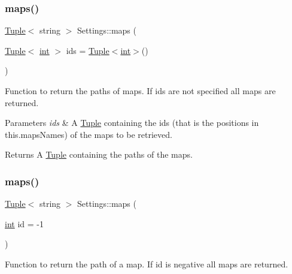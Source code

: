 \subsubsection{\texorpdfstring{maps()}{maps()}\hspace{0.1cm}{\footnotesize\ttfamily [1/4]}}
{\footnotesize\ttfamily \mbox{\hyperlink{class_tuple}{Tuple}}$<$ string $>$ Settings\+::maps (\begin{DoxyParamCaption}\item[{\mbox{\hyperlink{class_tuple}{Tuple}}$<$ \mbox{\hyperlink{draw_8hh_aa620a13339ac3a1177c86edc549fda9b}{int}} $>$}]{ids = {\ttfamily \mbox{\hyperlink{class_tuple}{Tuple}}$<$\mbox{\hyperlink{draw_8hh_aa620a13339ac3a1177c86edc549fda9b}{int}}$>$()} }\end{DoxyParamCaption})}



Function to return the paths of maps. If ids are not specified all maps are returned. 


\begin{DoxyParams}{Parameters}
{\em ids} & A \mbox{\hyperlink{class_tuple}{Tuple}} containing the ids (that is the positions in this.\+maps\+Names) of the maps to be retrieved. \\
\hline
\end{DoxyParams}
\begin{DoxyReturn}{Returns}
A \mbox{\hyperlink{class_tuple}{Tuple}} containing the paths of the maps. 
\end{DoxyReturn}
\mbox{\label{class_settings_adc050f187f4040f5e897b2ff41caedd0}} 
\subsubsection{\texorpdfstring{maps()}{maps()}\hspace{0.1cm}{\footnotesize\ttfamily [2/4]}}
{\footnotesize\ttfamily \mbox{\hyperlink{class_tuple}{Tuple}}$<$ string $>$ Settings\+::maps (\begin{DoxyParamCaption}\item[{\mbox{\hyperlink{draw_8hh_aa620a13339ac3a1177c86edc549fda9b}{int}}}]{id = {\ttfamily -\/1} }\end{DoxyParamCaption})}



Function to return the path of a map. If id is negative all maps are returned. 

